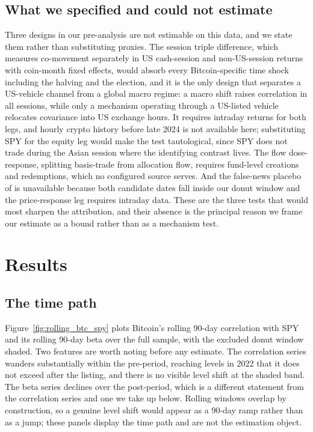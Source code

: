 \documentclass[12pt,a4paper]{article}
\begin{document}
\subsection{What we specified and could not estimate}

Three designs in our pre-analysis are not estimable on this data, and we state them rather than substituting proxies. The session triple difference, which measures co-movement separately in US cash-session and non-US-session returns with coin-month fixed effects, would absorb every Bitcoin-specific time shock including the halving and the election, and it is the only design that separates a US-vehicle channel from a global macro regime: a macro shift raises correlation in all sessions, while only a mechanism operating through a US-listed vehicle relocates covariance into US exchange hours. It requires intraday returns for both legs, and hourly crypto history before late 2024 is not available here; substituting SPY for the equity leg would make the test tautological, since SPY does not trade during the Asian session where the identifying contrast lives. The flow dose-response, splitting basis-trade from allocation flow, requires fund-level creations and redemptions, which no configured source serves. And the false-news placebo of \citet{pucher2026falsenews} is unavailable because both candidate dates fall inside our donut window and the price-response leg requires intraday data. These are the three tests that would most sharpen the attribution, and their absence is the principal reason we frame our estimate as a bound rather than as a mechanism test.

\section{Results}\label{sec:results}

\subsection{The time path}

Figure~\ref{fig:rolling_btc_spy} plots Bitcoin's rolling 90-day correlation with SPY and its rolling 90-day beta over the full sample, with the excluded donut window shaded. Two features are worth noting before any estimate. The correlation series wanders substantially within the pre-period, reaching levels in 2022 that it does not exceed after the listing, and there is no visible level shift at the shaded band. The beta series declines over the post-period, which is a different statement from the correlation series and one we take up below. Rolling windows overlap by construction, so a genuine level shift would appear as a 90-day ramp rather than as a jump; these panels display the time path and are not the estimation object.
\end{document}
